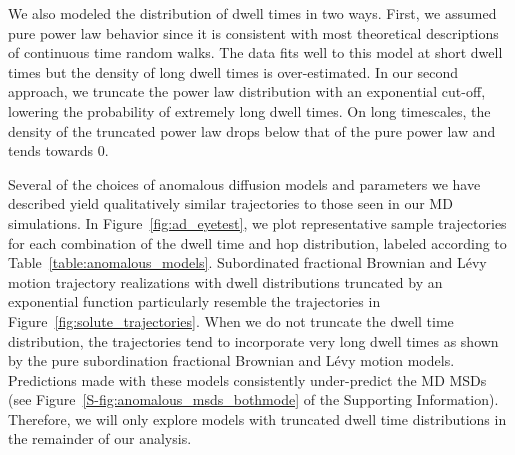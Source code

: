 \documentclass[journal=jctcce,manuscript=article]{achemso}
\begin{document}
  We also modeled the distribution of dwell times in two ways. First, we
  assumed pure power law behavior since it is consistent with most theoretical
  descriptions of continuous time random walks. The data fits well to this model 
  at short dwell times but the density of long dwell times is over-estimated.
  In our second approach, we truncate the power law distribution with an exponential
  cut-off, lowering the probability of extremely long dwell times. 
  On long timescales, the density of the truncated power law drops below that
  of the pure power law and tends towards 0. %
  
  Several of the choices of anomalous diffusion models and parameters we have
  described yield qualitatively similar trajectories to those seen in our MD 
  simulations. In Figure~\ref{fig:ad_eyetest}, we plot representative sample
  trajectories for each combination of the dwell time and hop distribution, 
  labeled according to Table~\ref{table:anomalous_models}. Subordinated fractional
  Brownian and L\'evy motion trajectory realizations with dwell distributions 
  truncated by an exponential function particularly resemble the trajectories in 
  Figure~\ref{fig:solute_trajectories}. When we do not truncate the dwell time 
  distribution, the trajectories tend to incorporate very long dwell times as shown
  by the pure subordination fractional Brownian and L\'evy motion models.
  Predictions made with these models consistently under-predict the MD MSDs
  (see Figure~\ref{S-fig:anomalous_msds_bothmode} of the Supporting Information).
  Therefore, we will only explore models with truncated dwell time distributions in
  the remainder of our analysis.   
  
\end{document}
